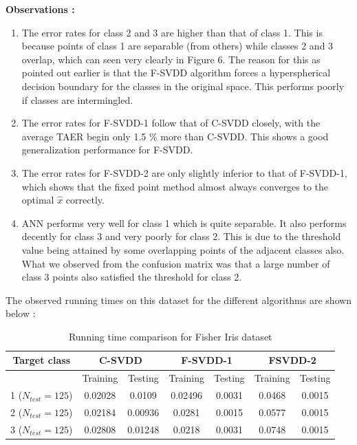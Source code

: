 \documentclass{article} %
\begin{document}
\textbf{Observations :}
\begin{enumerate}
\item The error rates for class 2 and 3 are higher than that of class 1. This is because points of class 1 are separable (from others) while classes 2 and 3 overlap, which can seen very clearly in Figure 6.  The reason for this as pointed out earlier is that the F-SVDD algorithm forces a hyperspherical decision boundary for the classes in the original space. This performs poorly if classes are intermingled.
\item The error rates for F-SVDD-1 follow that of C-SVDD closely, with the average TAER begin only 1.5 \% more than C-SVDD. This shows a good generalization performance for F-SVDD.
\item The error rates for F-SVDD-2 are only slightly inferior to that of F-SVDD-1, which shows that the fixed point method almost always converges to the optimal $\hat{x}$ correctly.
\item ANN performs very well for class 1 which is quite separable. It also performs decently for class 3 and very poorly for class 2. This is due to the threshold value being attained by some overlapping points of the adjacent classes also. What we observed from the confusion matrix was that a large number of class 3 points also satisfied the threshold for class 2.
\end{enumerate}



The observed running times on this dataset for the different algorithms are shown below :

\begin{table}[H]
\begin{center}
\caption{Running time comparison for Fisher Iris dataset}
\begin{tabular}{|c|c|c|c|c|c|c|}
\hline
Target class & \multicolumn{2}{|c|}{C-SVDD} & \multicolumn{2}{|c|}{F-SVDD-1} & \multicolumn{2}{|c|}{FSVDD-2}  \\ \hline
& Training & Testing & Training & Testing & Training & Testing \\ \hline
1 ($N_{test} =125$)  & 0.02028 & 0.0109 & 0.02496  & 0.0031 & 0.0468 & 0.0015 \\ \hline
2 ($N_{test} =125$) & 0.02184 & 0.00936 & 0.0281  &  0.0015 & 0.0577 & 0.0015 \\ \hline
3 ($N_{test} =125$) &  0.02808 &  0.01248 & 0.0218  & 0.0031 & 0.0748 & 0.0015 \\ \hline

\end{tabular} \\[5pt]
\end{center}
\end{table}
\end{document}
